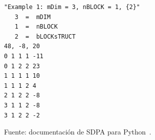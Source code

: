 \begin{table}[H]
\centering
\caption{Representación dispersa del ejemplo en formato SDPA sparse.}
\label{tab:sdpa_sparse_format_example}
\begin{minipage}{0.72\textwidth}
\begin{verbatim}
"Example 1: mDim = 3, nBLOCK = 1, {2}"
   3  =  mDIM
   1  =  nBLOCK
   2  =  bLOCKsTRUCT
48, -8, 20
0 1 1 1 -11
0 1 2 2 23
1 1 1 1 10
1 1 1 2 4
2 1 2 2 -8
3 1 1 2 -8
3 1 2 2 -2
\end{verbatim}
\end{minipage}

\vspace{0.15cm}
{\footnotesize Fuente: documentación de SDPA para Python~\parencite{SDPAFormat}.}
\end{table}

